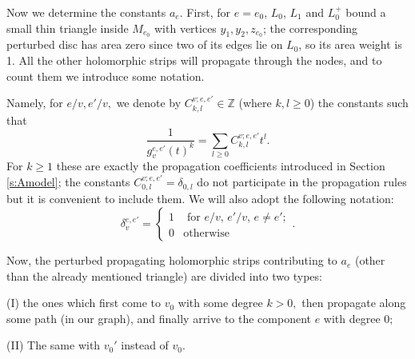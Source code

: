 \documentclass[11pt,leqno]{amsart}
\numberwithin{equation}{section}
\def\Z{\mathbb{Z}}
\begin{document}
Now we determine the constants $a_{e}$. First, for $e=e_0$, $L_0$, $L_1$ and $L_0^+$ bound a small thin triangle inside $M_{e_0}$ with vertices $y_1,y_2,z_{e_0}$; 
the corresponding perturbed disc has area zero since two of its edges lie on $L_0$, so its area weight is 1.
All the other holomorphic strips will propagate through the nodes, and to count them we introduce some notation.

Namely, for $e/v,e'/v,$ we denote by $C^{v;e,e'}_{k,l}\in\Z$ (where $k,l\geq 0$)  the constants such that $$\frac{1}{g_{v}^{e,e'}(t)^k}=\sum\limits_{l\geq 0}C^{v;e,e'}_{k,l}t^{l}.$$
For $k\geq 1$ these are exactly the propagation coefficients introduced in Section \ref{s:Amodel}; the constants $C^{v;e,e'}_{0,l}=\delta_{0,l}$ do not participate in the propagation rules but it is convenient to include them. We will also adopt the following notation: $$\delta_{v}^{e,e'}=\begin{cases}1 & \text{ for }e/v,\,e'/v,\,e\ne e';\\0 & \text{otherwise}\end{cases}.$$

Now, the perturbed propagating holomorphic strips contributing to $a_{e}$ (other than the already mentioned triangle) are divided into two types:

(I) the ones which first come to $v_0$ with some degree $k>0,$ then propagate along some path (in our graph), and finally arrive to the component $e$ with degree $0;$

(II) The same with $v_0'$ instead of $v_0.$
\end{document}

